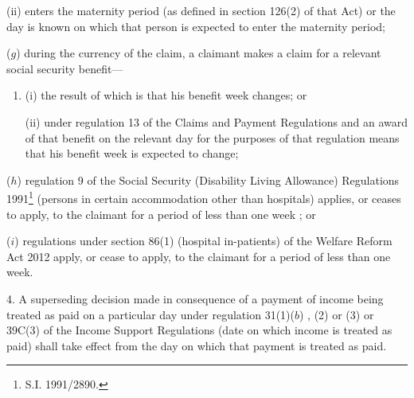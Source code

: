 \documentclass[12pt,a4paper]{article}
\begin{document}
\begin{enumerate}
\begin{enumerate}
(ii) enters the maternity period (as defined in section 126(2) of that Act) or the day is known on which that person is expected to enter the maternity period;
\end{enumerate}

($g$) during the currency of the claim, a claimant makes a claim for a relevant social security benefit—
\begin{enumerate}\item[]
(i) the result of which is that his benefit week changes; or

(ii) under regulation 13 of the Claims and Payment Regulations and an award of that benefit on the relevant day for the purposes of that regulation means that his benefit week is expected to change;
\end{enumerate}

($h$) regulation 9 of the Social Security (Disability Living Allowance) Regulations 1991\footnote{S.I. 1991/2890.} (persons in certain accommodation other than hospitals) applies, or ceases to apply, to the claimant for a period of less than one week%
%
; or

($i$) regulations under section 86(1) (hospital in-patients) of the Welfare Reform Act 2012 apply, or cease to apply, to the claimant for a period of less than one week.
\end{enumerate}


\medskip

4.  A superseding decision made in consequence of a payment of income being treated as paid on a particular day under regulation 31(1)($b$)%
, (2) or (3)  %
or 39C(3) of the Income Support Regulations (date on which income is treated as paid) shall take effect from the day on which that payment is treated as paid.
\end{document}

